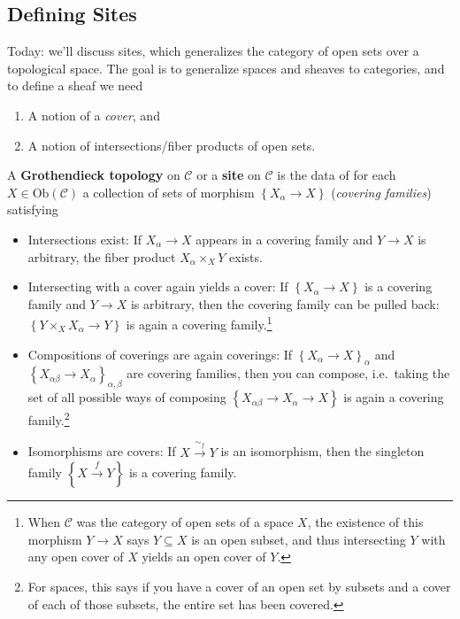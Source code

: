 \hypertarget{defining-sites}{%
\subsection{Defining Sites}\label{defining-sites}}

Today: we'll discuss sites, which generalizes the category of open sets
over a topological space. The goal is to generalize spaces and sheaves
to categories, and to define a sheaf we need

\begin{enumerate}
\def\labelenumi{\arabic{enumi}.}
\item
  A notion of a \emph{cover}, and
\item
  A notion of intersections/fiber products of open sets.
\end{enumerate}

\begin{definition}

A \textbf{Grothendieck topology} on \(\mathcal{C}\) or a \textbf{site}
on \(\mathcal{C}\) is the data of for each
\(X\in \mathrm{Ob}(\mathcal{C})\) a collection of sets of morphism
\(\left\{{X_\alpha \to X}\right\}\) (\emph{covering families})
satisfying

\begin{itemize}
\item
  Intersections exist: If \(X_\alpha\to X\) appears in a covering family
  and \(Y\to X\) is arbitrary, the fiber product \(X_\alpha\times_X Y\)
  exists.
\item
  Intersecting with a cover again yields a cover: If
  \(\left\{{X_\alpha\to X}\right\}\) is a covering family and \(Y\to X\)
  is arbitrary, then the covering family can be pulled back:
  \(\left\{{Y\times_X X_\alpha\to Y}\right\}\) is again a covering
  family.\footnote{When \(\mathcal{C}\) was the category of open sets of
    a space \(X\), the existence of this morphism \(Y\to X\) says
    \(Y \subseteq X\) is an open subset, and thus intersecting \(Y\)
    with any open cover of \(X\) yields an open cover of \(Y\).}
\item
  Compositions of coverings are again coverings: If
  \(\left\{{X_\alpha\to X}\right\}_{\alpha}\) and
  \(\left\{{X_{\alpha\beta} \to X_\alpha}\right\}_{\alpha,\beta}\) are
  covering families, then you can compose, i.e.~taking the set of all
  possible ways of composing
  \(\left\{{X_{\alpha\beta} \to X_\alpha \to X}\right\}\) is again a
  covering family.\footnote{For spaces, this says if you have a cover of
    an open set by subsets and a cover of each of those subsets, the
    entire set has been covered.}
\item
  Isomorphisms are covers: If \(X\xrightarrow{\sim_f} Y\) is an
  isomorphism, then the singleton family
  \(\left\{{X\xrightarrow{f} Y}\right\}\) is a covering family.
\end{itemize}

\end{definition}

